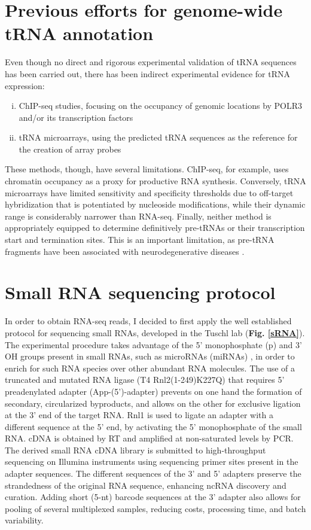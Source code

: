 \documentclass[12pt]{rockefeller}
\begin{document}
\section{Previous efforts for genome-wide tRNA annotation}

Even though no direct and rigorous experimental validation of tRNA sequences has been carried out, there has been indirect experimental evidence for tRNA expression:

\begin{enumerate}[i)]
\item ChIP-seq studies, focusing on the occupancy of genomic locations by POLR3 and/or its transcription factors \cite{Moqtaderi:2010hc,Oler:2010fb,Kutter:2011ff}
\item tRNA microarrays, using the predicted tRNA sequences as the reference for the creation of array probes \cite{Dittmar:2004fb}
\end{enumerate}

These methods, though, have several limitations. ChIP-seq, for example, uses chromatin occupancy as a proxy for productive RNA synthesis. Conversely, tRNA microarrays have limited sensitivity and specificity thresholds due to off-target hybridization that is potentiated by nucleoside modifications, while their dynamic range is considerably narrower than RNA-seq. Finally, neither method is appropriately equipped to determine definitively pre-tRNAs or their transcription start and termination sites. This is an important limitation, as pre-tRNA fragments have been associated with neurodegenerative diseases \cite{Hanada:2013bk, Weitzer:2014bi, Karaca:2014em}. 
	
\section{Small RNA sequencing protocol}
In order to obtain RNA-seq reads, I decided to first apply the well established protocol for sequencing small RNAs, developed in the Tuschl lab \cite{Hafner:2012eaa} (\textbf{Fig. \ref{sRNA}}). The experimental procedure takes advantage of the 5' monophosphate (p) and 3' OH groups present in small RNAs, such as microRNAs (miRNAs)	, in order to enrich for such RNA species over other abundant RNA molecules. The use of a truncated and mutated RNA ligase (T4 Rnl2(1-249)K227Q) that requires 5' preadenylated adapter (App-(5')-adapter) prevents on one hand the formation of secondary, circularized byproducts, and allows on the other for exclusive ligation at the 3' end of the target RNA. Rnl1 is used to ligate an adapter with a different sequence at the 5' end, by activating the 5' monophosphate of the small RNA. cDNA is obtained by RT and amplified at non-saturated levels by PCR. The derived small RNA cDNA library is submitted to high-throughput sequencing on Illumina instruments using sequencing primer sites present in the adapter sequences. The different sequences of the 3' and 5' adapters preserve the strandedness of the original RNA sequence, enhancing ncRNA discovery and curation. Adding short (5-nt) barcode sequences at the 3' adapter also allows for pooling of several multiplexed samples, reducing costs, processing time, and batch variability. 
\end{document}
